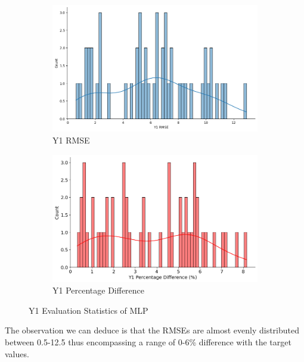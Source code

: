 \documentclass{report} %
\begin{document}
\begin{figure}[H]
    \centering
    \begin{subfigure}{0.5\textwidth}
        \centering
        \includegraphics[width=\textwidth]{./ReportImages/score_MLP_y1.png}
        \caption{Y1 \ac{RMSE}}
        \label{fig:Y1 RMSE}
    \end{subfigure}\hfill
    \begin{subfigure}{0.5\textwidth}
        \centering
        \includegraphics[width=\textwidth]{./ReportImages/percentage_diff_MLP_y1.png}
        \caption{Y1 Percentage Difference}
        \label{fig:Y1 Percentage Difference}
    \end{subfigure}
    \caption{Y1 Evaluation Statistics of \ac{MLP}}
    \label{fig:Y1 Evaluation Statistics MLP}
\end{figure}

The observation we can deduce is that the \ac{RMSE}s are almost evenly distributed between 0.5-12.5 thus encompassing a range of 0-6\% difference with the target values.
\end{document}
